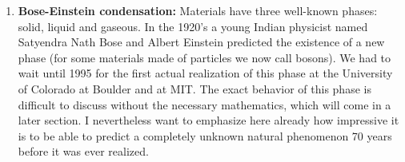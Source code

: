 \begin{enumerate}
\item \textbf{Bose-Einstein condensation: } Materials have three well-known phases: solid, liquid and gaseous. In the 1920's a young Indian physicist named Satyendra Nath Bose and Albert Einstein predicted the existence of a new phase (for some materials made of particles we now call bosons). We had to wait until 1995 for the first actual realization of this phase at the University of Colorado at Boulder and at MIT. The exact behavior of this phase is difficult to discuss without the necessary mathematics, which will come in a later section. I nevertheless want to emphasize here already how impressive it is to be able to predict a completely unknown natural phenomenon 70 years before it was ever realized.
\end{enumerate}